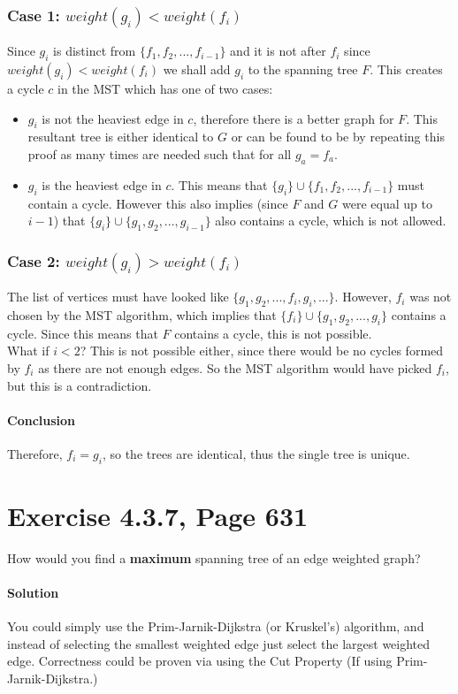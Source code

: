 \documentclass[12pt]{article}
\begin{document}
\subsubsection{Case 1: $weight(g_i) < weight(f_i)$}
Since $g_i$ is distinct from $ \{f_1, f_2, ..., f_{i-1} \} $ and it is not after $f_i$ since $weight(g_i) < weight(f_i)$ we shall add $g_i$ to the spanning tree $F$. This creates a cycle $c$ in the MST which has one of two cases:
\begin{itemize}
	\item $g_i$ is not the heaviest edge in $c$, therefore there is a better graph for $F$. This resultant tree is either identical to $G$ or can be found to be by repeating this proof as many times are needed such that for all $g_a = f_a$.
	\item $g_i$ is the heaviest edge in $c$. This means that $\{g_i\}\cup\{f_1, f_2, ...,f_{i-1}\}$ must contain a cycle. However this also implies (since $F$ and $G$ were equal up to $i-1$) that $\{g_i\}\cup\{g_1, g_2, ...,g_{i-1}\}$ also contains a cycle, which is not allowed.
\end{itemize}

\subsubsection{Case 2: $weight(g_i) > weight(f_i)$}
The list of vertices must have looked like $\{g_1, g_2, ... , f_i, g_i, ...\}$. However, $f_i$ was not chosen by the MST algorithm, which implies that $\{f_i\} \cup \{g_1, g_2, ..., g_i\}$ contains a cycle. Since this means that $F$ contains a cycle, this is not possible. \\
What if $i<2$? This is not possible either, since there would be no cycles formed by $f_i$ as there are not enough edges. So the MST algorithm would have picked $f_i$, but this is a contradiction.

\paragraph{Conclusion}
Therefore, $f_i = g_i$, so the trees are identical, thus the single tree is unique.

\section{Exercise 4.3.7, Page 631}
How would you find a {\bf maximum} spanning tree of an edge weighted graph?

\paragraph{Solution}
You could simply use the Prim-Jarnik-Dijkstra (or Kruskel's) algorithm, and instead of selecting the smallest weighted edge just select the largest weighted edge. Correctness could be proven via using the Cut Property (If using Prim-Jarnik-Dijkstra.)
\end{document}

